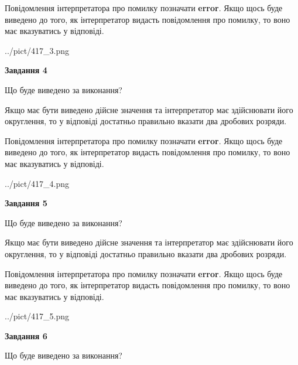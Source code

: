 \documentclass[12pt, ukrainian]{article}
\begin{document}
{\begin {Large}
Повідомлення інтерпретатора про помилку позначати \textbf{error}.
Якщо щось буде виведено до того, як інтерпретатор видасть повідомлення про помилку, 
то воно має вказуватись у відповіді. \par

\begin{center}
	{../pict/417_3.png}
\end{center}
\newpage

{\begin {center}\textbf{Завдання 4}\end {center}}\par
Що буде виведено за виконання? \par

Якщо має бути виведено дійсне значення та інтерпретатор має здійснювати його округлення, 
то у відповіді достатньо правильно вказати два дробових розряди.

Повідомлення інтерпретатора про помилку позначати \textbf{error}.
Якщо щось буде виведено до того, як інтерпретатор видасть повідомлення про помилку, 
то воно має вказуватись у відповіді. \par

\begin{center}
	{../pict/417_4.png}
\end{center}
\newpage

{\begin {center}\textbf{Завдання 5}\end {center}}\par
Що буде виведено за виконання? \par

Якщо має бути виведено дійсне значення та інтерпретатор має здійснювати його округлення, 
то у відповіді достатньо правильно вказати два дробових розряди.

Повідомлення інтерпретатора про помилку позначати \textbf{error}.
Якщо щось буде виведено до того, як інтерпретатор видасть повідомлення про помилку, 
то воно має вказуватись у відповіді. \par

\begin{center}
	{../pict/417_5.png}
\end{center}
\newpage

{\begin {center}\textbf{Завдання 6}\end {center}}\par
Що буде виведено за виконання? \par


\end{Large}}
\end{document}
